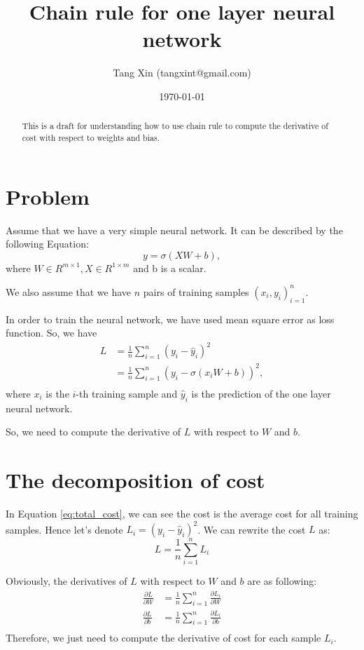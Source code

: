 \documentclass[a4paper]{article}
\title{Chain rule for one layer neural network}
\author{Tang Xin (tangxint@gmail.com)}
\date{\today}
\begin{document}
\maketitle

\begin{abstract}
This is a draft for understanding how to use chain rule to compute the derivative of cost with respect to weights and bias.
\end{abstract}

\section{Problem}
\label{sec:problem}
Assume that we have a very simple neural network. It can be described by the following Equation:
\begin{equation}
\label{eq:nn}
    y=\sigma(XW+b),
\end{equation}
where $W\in R^{m\times 1}, X\in R^{1\times m}$ and b is a scalar.

We also assume that we have $n$ pairs of training samples ${(x_i, y_i)}_{i=1}^{n}$. 

In order to train the neural network, we have used mean square error as loss function. So, we have
\begin{equation}
\label{eq:total_cost}
\begin{split}
    L &=  \frac{1}{n}\sum_{i=1}^{n}{(y_i - \hat{y}_i)^2} \\
      &=  \frac{1}{n}\sum_{i=1}^{n}{(y_i - \sigma(x_iW+b))^2}, \\
\end{split}
\end{equation}
where $x_i$ is the $i$-th training sample and $\hat{y}_i$ is the prediction of the one layer neural network. 

So, we need to compute the derivative of $L$ with respect to $W$ and $b$.

\section{The decomposition of cost}
In Equation \ref{eq:total_cost}, we can see the cost is the average cost for all training samples. Hence let's denote $L_i=(y_i - \hat{y}_i)^2$. We can rewrite the cost $L$ as:
\begin{equation*}
    L = \frac{1}{n}{\sum_{i=1}^{n}{L_i}}  
\end{equation*}

Obviously, the derivatives of $L$ with respect to $W$ and $b$ are as following:
\begin{align}
\label{eq:decomposition}   
\frac{\partial{L}}{\partial{W}} & = \frac{1}{n}\sum_{i=1}^{n}{\frac{\partial{L_i}}{\partial{W}}}  \\
\frac{\partial{L}}{\partial{b}} & = \frac{1}{n}\sum_{i=1}^{n}{\frac{\partial{L_i}}{\partial{b}}}  \\
\end{align}
Therefore, we just need to compute the derivative of cost for each sample $L_i$. 
\end{document}
